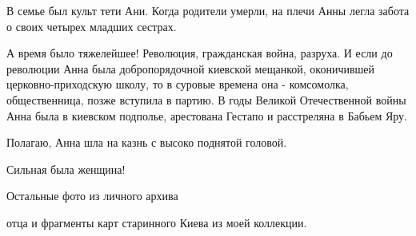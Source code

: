 В семье был культ тети Ани. Когда родители умерли, на плечи Анны легла забота о
своих четырех  младших сестрах.

А время было тяжелейшее! Революция, гражданская война, разруха. И если  до
революции Анна была добропорядочной киевской мещанкой, оконичившей
церковно-приходскую школу, то в суровые времена она - комсомолка,
общественница, позже вступила в партию. В годы Великой Отечественной войны Анна
была в киевском подполье, арестована Гестапо и расстреляна в Бабьем Яру. 

Полагаю, Анна шла на казнь с высоко поднятой головой. 

Сильная была женщина!

Остальные фото из личного архива 

отца и фрагменты карт старинного Киева из моей коллекции.
